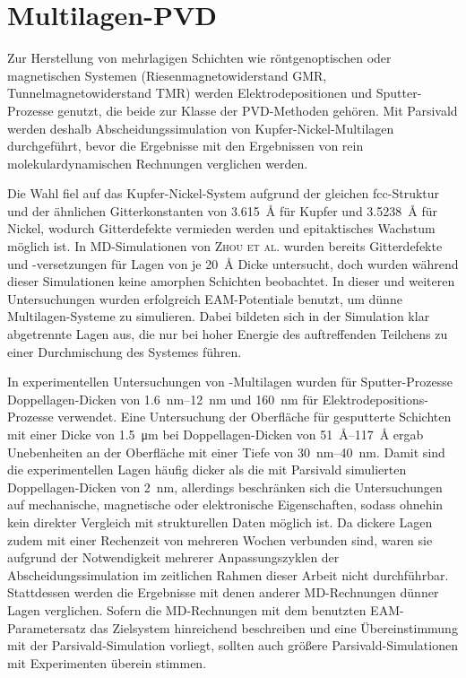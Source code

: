 \section{Multilagen-PVD}
\label{multilayer}

Zur Herstellung von mehrlagigen Schichten wie röntgenoptischen oder magnetischen Systemen (Riesenmagnetowiderstand GMR, Tunnelmagnetowiderstand TMR) werden Elektrodepositionen\cite{yang_pulsed_1995} und Sputter-Prozesse\cite{barshilia_characterization_2002,cammarata_nanoindentation_1990} genutzt, die beide zur Klasse der PVD-Methoden gehören.
Mit Parsivald werden deshalb Abscheidungssimulation von Kupfer-Nickel-Multilagen durchgeführt, bevor die Ergebnisse mit den Ergebnissen von rein molekulardynamischen Rechnungen verglichen werden.

Die Wahl fiel auf das Kupfer-Nickel-System aufgrund der gleichen fcc-Struktur und der ähnlichen Gitterkonstanten von \SI{3.615}{\angstrom} für Kupfer und \SI{3.5238}{\angstrom} für Nickel\cite{haynes_crc_2011}, wodurch Gitterdefekte vermieden werden und epitaktisches Wachstum möglich ist\cite{zhou_atomistic_1998}.
In MD-Simulationen von \textsc{Zhou et al.}\cite{zhou_atomistic_1998} wurden bereits Gitterdefekte und -versetzungen für Lagen von je \SI{20}{\angstrom} Dicke untersucht, doch wurden während dieser Simulationen keine amorphen Schichten beobachtet.
In dieser und weiteren Untersuchungen\cite{zhou_atomic_2001} wurden erfolgreich EAM-Potentiale benutzt, um dünne Multilagen-Systeme zu simulieren.
Dabei bildeten sich in der Simulation klar abgetrennte Lagen aus, die nur bei hoher Energie des auftreffenden Teilchens zu einer Durchmischung des Systemes führen\cite{zhou_atomistic_1998}.

In experimentellen Untersuchungen von -Multilagen wurden für Sputter-Prozesse Dop\-pel\-lagen-Dicken von \SIrange{1.6}{12}{\nano\meter}\cite{cammarata_nanoindentation_1990} und \SI{160}{\nano\meter} für Elektrodepositions-Prozesse\cite{yang_pulsed_1995} verwendet.
Eine Untersuchung der Oberfläche für gesputterte Schichten mit einer Dicke von \SI{1.5}{\micro\meter} bei Doppellagen-Dicken von \SIrange{51}{117}{\angstrom} ergab Unebenheiten an der Oberfläche mit einer Tiefe von \SIrange{30}{40}{\nano\meter}\cite{barshilia_characterization_2002}.
Damit sind die experimentellen Lagen häufig dicker als die mit Parsivald simulierten Doppel\-lagen-Dicken von \SI{2}{\nano\meter}, allerdings beschränken sich die Untersuchungen auf mechanische, magnetische oder elektronische Eigenschaften, sodass ohnehin kein direkter Vergleich mit strukturellen Daten möglich ist.
Da dickere Lagen zudem mit einer Rechenzeit von mehreren Wochen verbunden sind, waren sie aufgrund der Notwendigkeit mehrerer Anpassungszyklen der Abscheidungssimulation im zeitlichen Rahmen dieser Arbeit nicht durchführbar.
Stattdessen werden die Ergebnisse mit denen anderer MD-Rechnungen dünner Lagen verglichen\cite{zhou_atomistic_1998,zhou_atomic_2001}.
Sofern die MD-Rechnungen mit dem benutzten EAM-Parametersatz das Zielsystem hinreichend beschreiben und eine Übereinstimmung mit der Parsivald-Simulation vorliegt, sollten auch größere Parsivald-Simulationen mit Experimenten überein stimmen.

